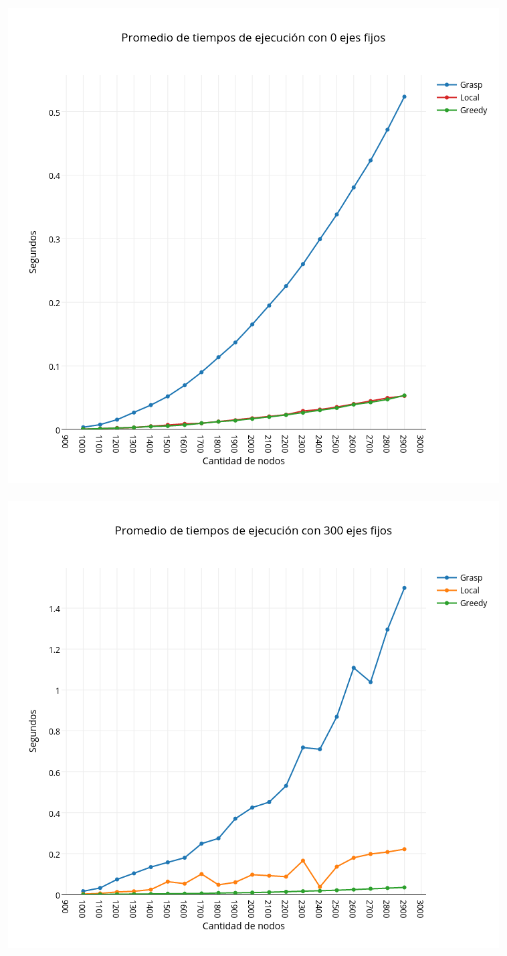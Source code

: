 \begin{center}
 	\includegraphics[width=13cm, keepaspectratio=yes]{imagenes/coliseo/Fixedge/0.png}

 	\includegraphics[width=13cm, keepaspectratio=yes]{imagenes/coliseo/Fixedge/300.png}


\end{center}
